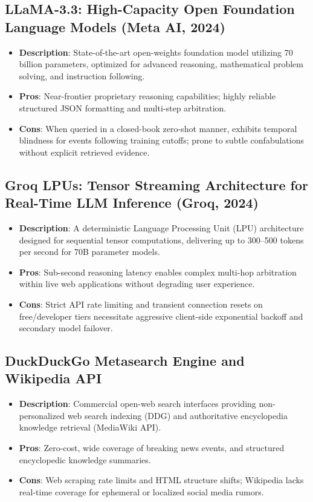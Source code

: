 \documentclass[12pt,a4paper]{report}
\begin{document}
\subsection{LLaMA-3.3: High-Capacity Open Foundation Language Models (Meta AI, 2024)}
\begin{itemize}
    \item \textbf{Description}: State-of-the-art open-weights foundation model utilizing 70 billion parameters, optimized for advanced reasoning, mathematical problem solving, and instruction following.
    \item \textbf{Pros}: Near-frontier proprietary reasoning capabilities; highly reliable structured JSON formatting and multi-step arbitration.
    \item \textbf{Cons}: When queried in a closed-book zero-shot manner, exhibits temporal blindness for events following training cutoffs; prone to subtle confabulations without explicit retrieved evidence.
\end{itemize}

\subsection{Groq LPUs: Tensor Streaming Architecture for Real-Time LLM Inference (Groq, 2024)}
\begin{itemize}
    \item \textbf{Description}: A deterministic Language Processing Unit (LPU) architecture designed for sequential tensor computations, delivering up to 300--500 tokens per second for 70B parameter models.
    \item \textbf{Pros}: Sub-second reasoning latency enables complex multi-hop arbitration within live web applications without degrading user experience.
    \item \textbf{Cons}: Strict API rate limiting and transient connection resets on free/developer tiers necessitate aggressive client-side exponential backoff and secondary model failover.
\end{itemize}

\subsection{DuckDuckGo Metasearch Engine and Wikipedia API}
\begin{itemize}
    \item \textbf{Description}: Commercial open-web search interfaces providing non-personalized web search indexing (DDG) and authoritative encyclopedia knowledge retrieval (MediaWiki API).
    \item \textbf{Pros}: Zero-cost, wide coverage of breaking news events, and structured encyclopedic knowledge summaries.
    \item \textbf{Cons}: Web scraping rate limits and HTML structure shifts; Wikipedia lacks real-time coverage for ephemeral or localized social media rumors.
\end{itemize}
\end{document}
